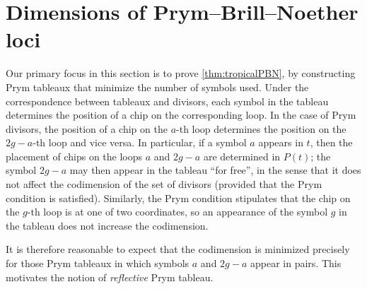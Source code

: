 \documentclass[11pt,reqno]{amsart}
\newcommand{\todo}[1]{\textcolor{red}{#1}}
\DeclareMathOperator{\codim}{codim}
\theoremstyle{definition}
\theoremstyle{problem}
\theoremstyle{plain}
\theoremstyle{remark}
\newtheorem{remark}[definition]{Remark}
\theoremstyle{theorem}
\numberwithin{equation}{section}
\numberwithin{figure}{section}
\theoremstyle{definition}
\theoremstyle{problem}
\theoremstyle{plain}
\begin{document}
%    



\section{Dimensions of Prym--Brill--Noether loci}

Our primary focus in this section is  to prove \cref{thm:tropicalPBN}, by constructing Prym tableaux  that minimize the number of symbols used.
Under the correspondence between tableaux and divisors, each symbol in the tableau determines the position of a chip on the corresponding loop. In the case of Prym divisors, the position of a chip on the $a$-th loop determines the position on the $2g-a$-th loop and vice versa. 
In particular, if a
symbol $a$ appears in $t$, then the placement of chips on the loops
$a$ and $2g-a$ are determined in $P(t)$; the symbol $2g-a$ may then
appear in the tableau ``for free'', in the sense that it does not affect the codimension of the set of divisors (provided that the Prym condition
is satisfied). Similarly, the Prym
condition stipulates that the chip on the $g$-th loop is at one of two
coordinates, so an appearance of the symbol $g$ in the tableau does
not increase the codimension. 

It is  therefore reasonable to expect that the codimension is minimized precisely for those Prym tableaux in which symbols $a$ and $2g-a$ appear in pairs. This motivates the notion of \emph{reflective} Prym tableau. 
\end{document}
